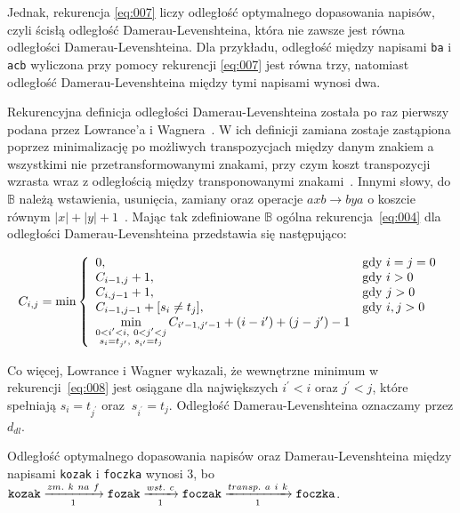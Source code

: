 \documentclass{praca1}
\begin{document}
Jednak, rekurencja \ref{eq:007} liczy odległość optymalnego dopasowania napisów, czyli ścisłą odległość Damerau-Levenshteina, która nie zawsze jest równa odległości Damerau-Levenshteina. Dla przykładu, odległość między napisami \verb|ba| i \verb|acb| wyliczona przy pomocy rekurencji \ref{eq:007} jest równa trzy, natomiast odległość Damerau-Levenshteina między tymi napisami wynosi dwa.

Rekurencyjna definicja odległości Damerau-Levenshteina została po raz pierwszy podana przez Lowrance'a i Wagnera~\cite{Wagner1975:extensionstring}. W ich definicji zamiana zostaje zastąpiona poprzez minimalizację po możliwych transpozycjach między danym znakiem a wszystkimi nie przetransformowanymi znakami, przy czym koszt transpozycji wzrasta wraz z odległością między transponowanymi znakami~\cite{Loo2014:stringdist}. Innymi słowy, do $\mathbb{B}$ należą wstawienia, usunięcia, zamiany oraz operacje $axb \rightarrow bya$ o koszcie równym $|x| + |y| + 1$~\cite{Boytsov2011:indexingmethods}. Mając tak zdefiniowane $\mathbb{B}$ ogólna rekurencja~\ref{eq:004} dla odległości Damerau-Levenshteina przedstawia się następująco: 

\begin{equation}
\label{eq:008}
C_{i,j} = \min\left\{
\begin{array}{l l}     
    0, & \text{gdy } i = j = 0\\
    C_{i-1, j} + 1, & \text{gdy } i > 0 \\
    C_{i, j-1} + 1, & \text{gdy } j > 0 \\
    C_{i-1, j-1} + [s_{i}\neq t_{j}], & \text{gdy } i, j > 0 \\
    \min\limits_{\substack{0 < i^{\prime} < i,\ 0 < j^{\prime} < j  \\ s_i = t_{j^{\prime}},\ s_{i^{\prime}} = t_j}} C_{i^{\prime}-1, j^{\prime}-1} + (i-i^{\prime}) + (j-j^{\prime}) - 1
\end{array}\right.
\end{equation}

Co więcej, Lowrance i Wagner wykazali, że wewnętrzne minimum w rekurencji~\ref{eq:008} jest osiągane dla największych $i^{\prime} < i$ oraz $j^{\prime} < j$, które spełniają $s_i = t_{j^{\prime}}$ oraz $\ s_{i^{\prime}} = t_j$. Odległość Damerau-Levenshteina oznaczamy przez $d_{dl}$.

\begin{example}
Odległość optymalnego dopasowania napisów oraz Damerau-Levenshteina między napisami \verb|kozak| i \verb|foczka| wynosi $3$, bo $\verb|kozak| \xrightarrow[1]{zm.\ k\ na\ f} \verb|fozak|  \xrightarrow[1]{wst.\ c} \verb|foczak| \xrightarrow[1]{transp.\ a\ i\ k} \verb|foczka|$.
\end{example}
\end{document}
